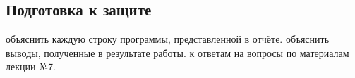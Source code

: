 \subsection{Подготовка к защите}

\begin{enumerate}
     объяснить каждую строку программы, представленной в отчёте. 
     объяснить выводы, полученные в результате работы.
     к ответам на вопросы по материалам лекции №7.
\end{enumerate}

